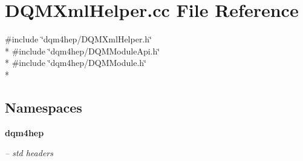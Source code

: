 \section{D\+Q\+M\+Xml\+Helper.\+cc File Reference}
\label{DQMXmlHelper_8cc}
{\ttfamily \#include \char`\"{}dqm4hep/\+D\+Q\+M\+Xml\+Helper.\+h\char`\"{}}\\*
{\ttfamily \#include \char`\"{}dqm4hep/\+D\+Q\+M\+Module\+Api.\+h\char`\"{}}\\*
{\ttfamily \#include \char`\"{}dqm4hep/\+D\+Q\+M\+Module.\+h\char`\"{}}\\*
\subsection*{Namespaces}
\begin{DoxyCompactItemize}
\item 
 {\bf dqm4hep}
\begin{DoxyCompactList}\small\item\em -- std headers \end{DoxyCompactList}\end{DoxyCompactItemize}

